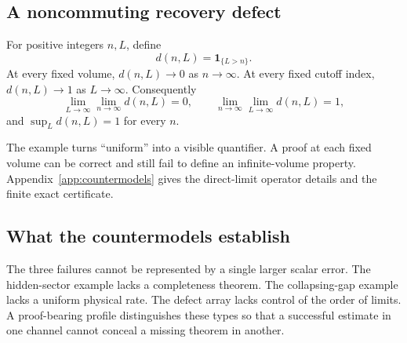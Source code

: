 \subsection{A noncommuting recovery defect}

\begin{counterexample}
\label{ex:limits}
For positive integers $n,L$, define
\[
 d(n,L)=\mathbf 1_{\{L>n\}}.
\]
At every fixed volume, $d(n,L)\to0$ as $n\to\infty$.  At every fixed cutoff
index, $d(n,L)\to1$ as $L\to\infty$.  Consequently
\[
 \lim_{L\to\infty}\lim_{n\to\infty}d(n,L)=0,
 \qquad
 \lim_{n\to\infty}\lim_{L\to\infty}d(n,L)=1,
\]
and $\sup_L d(n,L)=1$ for every $n$.
\end{counterexample}

The example turns ``uniform'' into a visible quantifier.  A proof at each
fixed volume can be correct and still fail to define an infinite-volume
property.  Appendix~\ref{app:countermodels} gives the direct-limit operator
details and the finite exact certificate.

\subsection{What the countermodels establish}

The three failures cannot be represented by a single larger scalar error.
The hidden-sector example lacks a completeness theorem.  The collapsing-gap
example lacks a uniform physical rate.  The defect array lacks control of the
order of limits.  A proof-bearing profile distinguishes these types so that a
successful estimate in one channel cannot conceal a missing theorem in
another.
